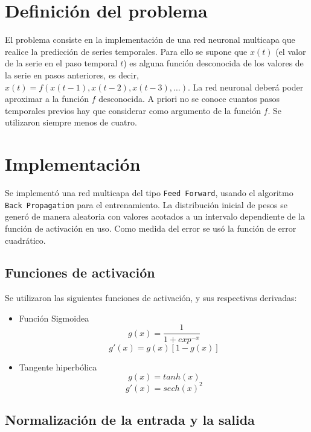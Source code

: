 \documentclass[a4paper,10pt]{article}
\begin{document}
\setcounter{page}{1}


\section{Definición del problema}

El problema consiste en la implementación de una red neuronal multicapa que realice la predicción de series temporales. Para ello se supone que $x(t)$ (el valor de la 
serie en el paso temporal $t$) es alguna función desconocida de los valores de la serie en pasos anteriores, es decir, $x(t) = f (x(t - 1), x(t - 2), x(t - 3), \dots)$. 
La red neuronal deberá poder aproximar a la función $f$ desconocida. A priori no se conoce cuantos pasos temporales previos hay que considerar como argumento 
de la función $f$. Se utilizaron siempre menos de cuatro.

\section{Implementación}

    Se implementó una red multicapa del tipo \texttt{Feed Forward}, usando el algoritmo \texttt{Back Propagation} para el entrenamiento. La distribución inicial de pesos 
    se generó de manera aleatoria con valores acotados a un intervalo dependiente de la función de activación en uso. Como medida del error se usó la función de error cuadrático.

    \subsection{Funciones de activación}
    Se utilizaron las siguientes funciones de activación, y sus respectivas derivadas:

    \begin{itemize}
        \item Función Sigmoidea
            \[ g(x) = \dfrac{1}{1 + exp^{-x}} \]
            \[ g'(x) = g(x)[1 - g(x)]\]
        \item Tangente hiperbólica
            \[ g(x) = tanh(x) \]
            \[ g'(x) = sech(x)^{2} \]
    \end{itemize}

    \subsection{Normalización de la entrada y la salida}
\end{document}
